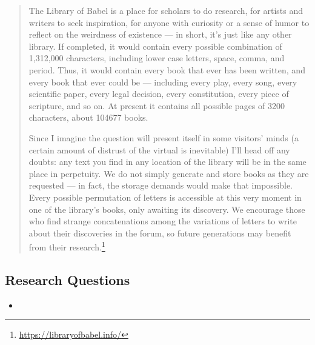 \begin{quote}
  The Library of Babel is a place for scholars to do research, for artists and writers to seek inspiration, for anyone with curiosity or a sense of humor to reflect on the weirdness of existence --- in short, it’s just like any other library. If completed, it would contain every possible combination of 1,312,000 characters, including lower case letters, space, comma, and period. Thus, it would contain every book that ever has been written, and every book that ever could be --- including every play, every song, every scientific paper, every legal decision, every constitution, every piece of scripture, and so on. At present it contains all possible pages of 3200 characters, about 104677 books.

  Since I imagine the question will present itself in some visitors’ minds (a certain amount of distrust of the virtual is inevitable) I’ll head off any doubts: any text you find in any location of the library will be in the same place in perpetuity. We do not simply generate and store books as they are requested --- in fact, the storage demands would make that impossible. Every possible permutation of letters is accessible at this very moment in one of the library's books, only awaiting its discovery. We encourage those who find strange concatenations among the variations of letters to write about their discoveries in the forum, so future generations may benefit from their research.\footnote{\url{https://libraryofbabel.info/}}
\end{quote}

\subsection{Research Questions}

\begin{itemize}
  \item 
\end{itemize}

